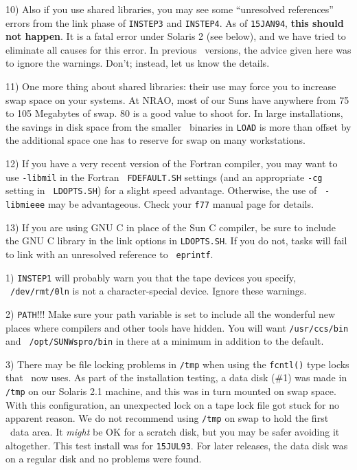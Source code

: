 {{\item{10)} Also if you use shared libraries, you may see some
``unresolved references'' errors from the link phase of {\tt INSTEP3}
and {\tt INSTEP4}.  As of {\tt 15JAN94}, {\bf this should not happen}.  It
is a fatal error under Solaris 2 (see below), and we have tried to
eliminate all causes for this error.  In previous \AIPS\ versions, the
advice given here was to ignore the warnings.  Don't; instead, let us know
the details.

\item{11)} One more thing about shared libraries: their use may force
you to increase swap space on your systems.  At NRAO, most of our Suns
have anywhere from 75 to 105 Megabytes of swap.  80 is a good value to
shoot for.  In large installations, the savings in disk space from the
smaller \AIPS\ binaries in {\tt\dol LOAD} is more than offset by the
additional space one has to reserve for swap on many workstations.
\medskip

\item{12)} If you have a very recent version of the Fortran
compiler, you may want to use {\tt -libmil} in the Fortran {\tt
FDEFAULT.SH} settings (and an appropriate {\tt -cg} setting in {\tt
LDOPTS.SH}) for a slight speed advantage.  Otherwise, the use of {\tt
-libmieee} may be advantageous.  Check your {\tt f77} manual page for
details.\medskip

\item{13)} If you are using GNU C in place of the Sun C compiler, be sure
to include the GNU C library in the link options in {\tt LDOPTS.SH}.  If
you do not, tasks will fail to link with an unresolved reference to {\tt
{} eprintf}.

\medskip{}

\item{1)}  {\tt INSTEP1} will probably warn you that the tape devices
you specify, \eg\ {\tt /dev/rmt/0ln} is not a character-special device.
Ignore these warnings.

\item{2)} {\tt PATH}!!!  Make sure your path variable is set to include
all the wonderful new places where compilers and other tools have
hidden.  You will want {\tt /usr/ccs/bin} and {\tt
/opt/SUNWspro/bin} in there at a minimum in addition to the default.

\item{3)} There may be file locking problems in {\tt /tmp} when using
the {\tt fcntl()} type locks that \AIPS\ now uses.  As part of the
installation testing, a data disk (\#1) was made in {\tt /tmp} on our
Solaris 2.1 machine, and this was in turn mounted on swap space.  With
this configuration, an unexpected lock on a tape lock file got stuck for
no apparent reason.  We do not recommend using {\tt /tmp} on swap to hold
the first \AIPS\ data area.  It {\it might\/} be OK for a scratch disk,
but you may be safer avoiding it altogether.  This test install was for
{\tt 15JUL93}.  For later releases, the data disk was on a regular disk
and no problems were found.

}}
